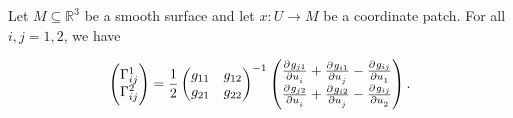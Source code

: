 \vspace{1mm}

\begin{lemma}
	Let $M \subseteq \mathbb{R}^3$ be a smooth surface and let $x: U \to M$ be a coordinate patch. For all $i,j = 1,2$, we have 

	\begin{equation}
		\begin{pmatrix}
			\Gamma^1_{ij}\\
			\Gamma^2_{ij}
		\end{pmatrix}
		= \frac{1}{2}\begin{pmatrix}
			g_{11} & g_{12}\\
			g_{21} & g_{22}
		\end{pmatrix}^{-1}
		\begin{pmatrix}
			\pd{g_{j1}}{u_i} + \pd{g_{i1}}{u_j} - \pd{g_{ij}}{u_1}\\
			\pd{g_{j2}}{u_i} + \pd{g_{i2}}{u_j} - \pd{g_{ij}}{u_2}
		\end{pmatrix}.
	\end{equation}
\end{lemma}

